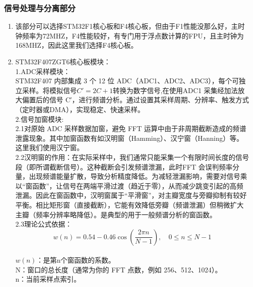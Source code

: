 \documentclass{article}
\begin{document}
\begin{enumerate}
\subsubsection{信号处理与分离部分}
\begin{enumerate}
\item 该部分可以选择STM32F1核心板和F4核心板，但由于F1性能没那么好，主时钟频率为72MHZ，F4性能较好，有专门用于浮点数计算的FPU，且主时钟为168MHZ，因此这里我们选择F4核心板。
\item STM32F407ZGT6核心板模块：
\\1.ADC采样模块：
\\STM32F407 内部集成 3 个 12 位 ADC（ADC1、ADC2、ADC3），每个可独立采样。将模拟信号$C' = 2C + 1$转换为数字信号,在使用ADC1 采集经加法放大偏置后的信号 C′，进行频谱分析。通过设置其采样周期、分辨率、触发方式（定时器或DMA），实现稳定、快速采样。
\\2.信号加窗模块:
\\2.1对原始 ADC 采样数据加窗，避免 FFT 运算中由于非周期截断造成的频谱泄露现象。其中加窗函数有如汉明窗（Hamming）、汉宁窗（Hanning）等。这里我们使用汉宁窗。
\\2.2汉明窗的作用：在实际采样中，我们通常只能采集一个有限时间长度的信号段（即所谓截断信号）。这种截断会引发频谱泄漏，此时FFT 会误判频率分量，出现频谱能量扩散，导致分析精度降低。为减轻泄漏影响，需要对信号乘以“窗函数”，让信号在两端平滑过渡（趋近于零），从而减少跳变引起的高频泄漏。因此在窗函数中，汉明窗属于“平滑窗”，对主瓣宽度与旁瓣抑制有较好平衡。相比矩形窗（直接截断），它能有效降低旁瓣（频谱泄漏）但稍微扩大主瓣（频率分辨率略降低）。是典型的用于一般频谱分析的窗函数。
\\2.3理论公式依据：
\begin{equation}
w(n) = 0.54 - 0.46 \cos\left(\frac{2\pi n}{N-1}\right), \quad 0 \leq n \leq N-1
\end{equation}
\\$w(n)$：是第n个窗函数的系数。
\\N：窗口的总长度（通常为你的 FFT 点数，例如 256、512、1024）。
\\n：当前采样点索引。


\end{enumerate}
\end{enumerate}
\end{document}
